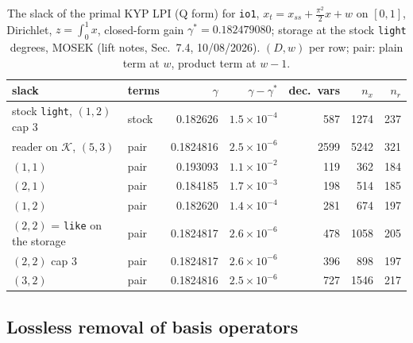 \documentclass[12pt]{article}
\newcommand{\mcl}[1]{\mathcal{#1}}
\newcommand{\code}[1]{\texttt{#1}}
\theoremstyle{plain}
\theoremstyle{definition}
\theoremstyle{remark}
\begin{document}
\begin{table}[h]\centering\footnotesize
\setlength{\tabcolsep}{5pt}
\begin{tabular}{llrrrrr}
\toprule
slack & terms & $\gamma$ & $\gamma-\gamma^*$ & dec.\ vars & $n_x$ & $n_r$ \\
\midrule
stock \code{light}, $(1,2)$ cap 3 & stock & 0.182626 & $1.5\times10^{-4}$ & 587 & 1274 & 237 \\
reader on $\mcl K$, $(5,3)$ & pair & 0.1824816 & $2.5\times10^{-6}$ & 2599 & 5242 & 321 \\
$(1,1)$ & pair & 0.193093 & $1.1\times10^{-2}$ & 119 & 362 & 184 \\
$(2,1)$ & pair & 0.184185 & $1.7\times10^{-3}$ & 198 & 514 & 185 \\
$(1,2)$ & pair & 0.182620 & $1.4\times10^{-4}$ & 281 & 674 & 197 \\
$(2,2)$ = \code{like} on the storage & pair & 0.1824817 & $2.6\times10^{-6}$ & 478 & 1058 & 205 \\
$(2,2)$ cap 3 & pair & 0.1824817 & $2.6\times10^{-6}$ & 396 & 898 & 197 \\
$(3,2)$ & pair & 0.1824816 & $2.5\times10^{-6}$ & 727 & 1546 & 217 \\
\bottomrule
\end{tabular}
\caption{The slack of the primal KYP LPI (Q form) for \code{io1}, $x_t=x_{ss}+\tfrac{\pi^2}{2}x+w$ on $[0,1]$, Dirichlet, $z=\int_0^1x$, closed-form gain $\gamma^*=0.182479080$; storage at the stock \code{light} degrees, MOSEK (lift notes, Sec.~7.4, 10/08/2026). $(D,w)$ per row; pair: plain term at $w$, product term at $w-1$.}\label{tab:kyp}
\end{table}

\subsection{Lossless removal of basis operators}\label{sec:reach}
\end{document}
